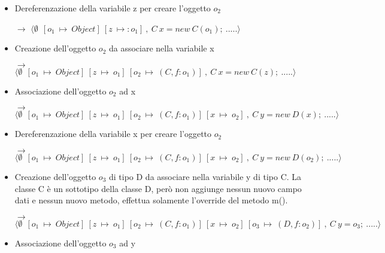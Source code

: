 \begin{itemize}
		\begin{itemize}
		\item[-] E[] $\equiv$ []
		\item[-] $t$ $\equiv$ Object z=$o_1$ 
		\item[-] $\sigma\:\equiv\:\emptyset\:\:[o_1\:\mapsto\:(Object)]$
		\end{itemize}


\vspace{0,5cm}
\item Dereferenzazione della variabile z per creare l'oggetto $o_2$

$\rightarrow$ $\langle\emptyset\:\:[o_1\:\mapsto\:Object]\:[z\:\mapsto:o_1]\:,\:C\:x=new\:C(o_1);\:.....\rangle$

\vspace{0,5cm}
\item Creazione dell'oggetto $o_2$ da associare nella variabile x

$\rightarrow$ $\langle\emptyset\:\:[o_1\:\mapsto\:Object]\:[z\:\mapsto\:o_1]\:[o_2\:\mapsto\:(C,f:o_1)]\:,\:C\:x=new\:C(z);\:.....\rangle$

\vspace{0,5cm}
\item Associazione dell'oggetto $o_2$ ad x

$\rightarrow$ $\langle\emptyset\:\:[o_1\:\mapsto\:Object]\:[z\:\mapsto\:o_1]\:[o_2\:\mapsto\:(C,f:o_1)]\:[x\:\mapsto\:o_2]\:,\:C\:y=new\:D(x);\:.....\rangle$

\vspace{0,5cm}
\item Dereferenzazione della variabile x per creare l'oggetto $o_2$

$\rightarrow$ $\langle\emptyset\:\:[o_1\:\mapsto\:Object]\:[z\:\mapsto\:o_1]\:[o_2\:\mapsto\:(C,f:o_1)]\:[x\:\mapsto\:o_2]\:,\:C\:y=new\:D(o_2);\:.....\rangle$

\vspace{0,5cm}
\item Creazione dell'oggetto $o_3$ di tipo D da associare nella variabile y di tipo C. La classe C \`e un sottotipo della classe D, per\`o non aggiunge nessun nuovo campo dati e nessun nuovo metodo, effettua solamente l'override del metodo m().

$\rightarrow$ $\langle\emptyset\:\:[o_1\:\mapsto\:Object]\:[z\:\mapsto\:o_1]\:[o_2\:\mapsto\:(C,f:o_1)]\:[x\:\mapsto\:o_2]\:[o_3\:\mapsto\:(D,f:o_2)]\:,\:C\:y=o_3;\:.....\rangle$

\vspace{0,5cm}
\item Associazione dell'oggetto $o_3$ ad y


\end{itemize}
